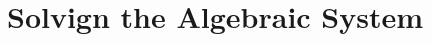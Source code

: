 \documentclass[../fem.tex]{subfile}
\begin{document}
\section{Solvign the Algebraic System}%
\label{sec:solvign_the_algebraic_system}
\end{document}
